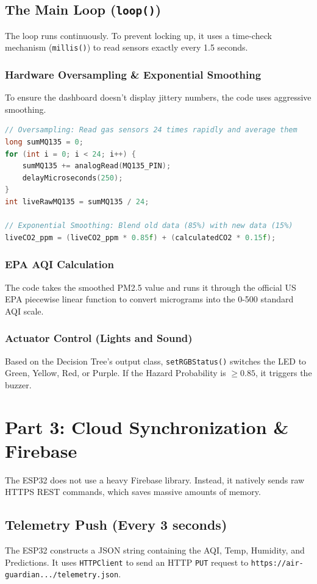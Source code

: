 \documentclass[11pt,a4paper]{article}
\begin{document}
\subsection{The Main Loop (\texttt{loop()})}
The loop runs continuously. To prevent locking up, it uses a time-check mechanism (\texttt{millis()}) to read sensors exactly every 1.5 seconds.

\subsubsection{Hardware Oversampling \& Exponential Smoothing}
To ensure the dashboard doesn't display jittery numbers, the code uses aggressive smoothing.
\begin{lstlisting}[language=C++]
// Oversampling: Read gas sensors 24 times rapidly and average them
long sumMQ135 = 0;
for (int i = 0; i < 24; i++) {
    sumMQ135 += analogRead(MQ135_PIN);
    delayMicroseconds(250);
}
int liveRawMQ135 = sumMQ135 / 24;

// Exponential Smoothing: Blend old data (85%) with new data (15%)
liveCO2_ppm = (liveCO2_ppm * 0.85f) + (calculatedCO2 * 0.15f);
\end{lstlisting}

\subsubsection{EPA AQI Calculation}
The code takes the smoothed PM2.5 value and runs it through the official US EPA piecewise linear function to convert micrograms into the 0-500 standard AQI scale.

\subsubsection{Actuator Control (Lights and Sound)}
Based on the Decision Tree's output class, \texttt{setRGBStatus()} switches the LED to Green, Yellow, Red, or Purple. If the Hazard Probability is $\geq 0.85$, it triggers the buzzer.

\section{Part 3: Cloud Synchronization \& Firebase}
The ESP32 does not use a heavy Firebase library. Instead, it natively sends raw HTTPS REST commands, which saves massive amounts of memory.

\subsection{Telemetry Push (Every 3 seconds)}
The ESP32 constructs a JSON string containing the AQI, Temp, Humidity, and Predictions. It uses \texttt{HTTPClient} to send an HTTP \texttt{PUT} request to \texttt{https://air-guardian.../telemetry.json}.
\end{document}
